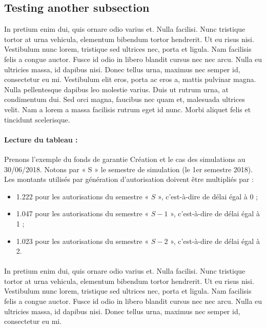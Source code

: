 \documentclass[12pt,a4paper]{report}
\begin{document}
\subsection{Testing another subsection}

In pretium enim dui, quis ornare odio varius et. Nulla facilisi. Nunc tristique tortor at urna vehicula, elementum bibendum tortor hendrerit. Ut eu risus nisi. Vestibulum nunc lorem, tristique sed ultrices nec, porta et ligula. Nam facilisis felis a congue auctor. Fusce id odio in libero blandit cursus nec nec arcu. Nulla eu ultricies massa, id dapibus nisi. Donec tellus urna, maximus nec semper id, consectetur eu mi. Vestibulum elit eros, porta ac eros a, mattis pulvinar magna. Nulla pellentesque dapibus leo molestie varius. Duis ut rutrum urna, at condimentum dui. Sed orci magna, faucibus nec quam et, malesuada ultrices velit. Nam a lorem a massa facilisis rutrum eget id nunc. Morbi aliquet felis et tincidunt scelerisque. 

\paragraph{Lecture du tableau :} 
Prenons l’exemple du fonds de garantie Création et le cas des simulations au 30/06/2018. Notons par « S » le semestre de simulation (le 1er semestre 2018). Les montants utilisés par génération d’autorisation doivent être multipliés par :
\begin{itemize}
    \item 1.222 pour les autorisations du semestre « $S$ », c’est-à-dire de délai égal à 0 ;
    \item 1.047 pour les autorisations du semestre « $S -1$ », c’est-à-dire de délai égal à 1 ;
    \item 1.023 pour les autorisations du semestre « $S-2$ », c’est-à-dire de délai égal à 2.
\end{itemize}

\paragraph{}
In pretium enim dui, quis ornare odio varius et. Nulla facilisi. Nunc tristique tortor at urna vehicula, elementum bibendum tortor hendrerit. Ut eu risus nisi. Vestibulum nunc lorem, tristique sed ultrices nec, porta et ligula. Nam facilisis felis a congue auctor. Fusce id odio in libero blandit cursus nec nec arcu. Nulla eu ultricies massa, id dapibus nisi. Donec tellus urna, maximus nec semper id, consectetur eu mi.
\end{document}
